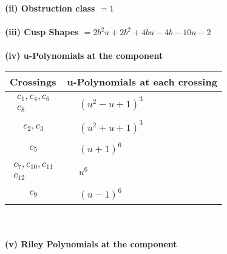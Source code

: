 \documentclass[1p]{elsarticle_modified}
\theoremstyle{definition}
\begin{document}
\flushleft \textbf{(ii) Obstruction class $= 1$}\\~\\
\flushleft \textbf{(iii) Cusp Shapes $= 2 b^2 u+2 b^2+4 b u-4 b-10 u-2$}\\~\\
\newpage\renewcommand{\arraystretch}{1}
\flushleft \textbf{(iv) u-Polynomials at the component}\newline \\
\begin{tabular}{m{50pt}|m{274pt}}
Crossings & \hspace{64pt}u-Polynomials at each crossing \\
\hline $$\begin{aligned}c_{1},c_{4},c_{6}\\c_{8}\end{aligned}$$&$\begin{aligned}
&(u^2- u+1)^3
\end{aligned}$\\
\hline $$\begin{aligned}c_{2},c_{3}\end{aligned}$$&$\begin{aligned}
&(u^2+u+1)^3
\end{aligned}$\\
\hline $$\begin{aligned}c_{5}\end{aligned}$$&$\begin{aligned}
&(u+1)^6
\end{aligned}$\\
\hline $$\begin{aligned}c_{7},c_{10},c_{11}\\c_{12}\end{aligned}$$&$\begin{aligned}
&u^6
\end{aligned}$\\
\hline $$\begin{aligned}c_{9}\end{aligned}$$&$\begin{aligned}
&(u-1)^6
\end{aligned}$\\
\hline
\end{tabular}\\~\\
\newpage\renewcommand{\arraystretch}{1}
\flushleft \textbf{(v) Riley Polynomials at the component}\newline \\
\end{document}
